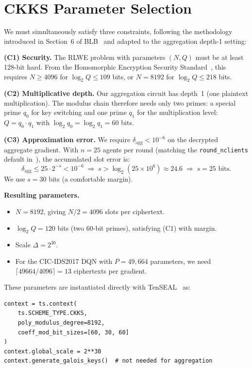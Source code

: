 \documentclass[letterpaper,journal]{IEEEtran}
\begin{document}
\section{CKKS Parameter Selection}\label{sec:parameters}

We must simultaneously satisfy three constraints, following the methodology
introduced in Section~6 of BLB~\cite{blb2025} and adapted to the aggregation
depth-1 setting:

\textbf{(C1) Security.}
The RLWE problem with parameters $(N, Q)$ must be at least 128-bit hard.
From the Homomorphic Encryption Security Standard~\cite{HEstandard}, this
requires $N \geq 4096$ for $\log_2 Q \leq 109$ bits, or $N = 8192$ for
$\log_2 Q \leq 218$ bits.

\textbf{(C2) Multiplicative depth.}
Our aggregation circuit has depth~1 (one plaintext multiplication).
The modulus chain therefore needs only two primes: a special prime $q_0$ for
key switching and one prime $q_1$ for the multiplication level:
$Q = q_0 \cdot q_1$ with $\log_2 q_0 = \log_2 q_1 = 60$ bits.

\textbf{(C3) Approximation error.}
We require $\delta_{\text{agg}} < 10^{-6}$ on the decrypted aggregate gradient.
With $n = 25$ agents per round (matching the \texttt{round\_nclients}
default in~\cite{frlconf2026}), the accumulated slot error is:
\[
  \delta_{\text{agg}} \leq 25 \cdot 2^{-s} < 10^{-6}
  \;\Rightarrow\;
  s > \log_2(25 \times 10^6) \approx 24.6 \;\Rightarrow\; s = 25\text{ bits}.
\]
We use $s = 30$ bits (a comfortable margin).

\textbf{Resulting parameters.}
\begin{itemize}
  \item $N = 8192$, giving $N/2 = 4096$ slots per ciphertext.
  \item $\log_2 Q = 120$ bits (two 60-bit primes), satisfying (C1) with margin.
  \item Scale $\Delta = 2^{30}$.
  \item For the CIC-IDS2017 DQN with $P = 49{,}664$ parameters, we need
        $\lceil 49664/4096 \rceil = 13$ ciphertexts per gradient.
\end{itemize}

These parameters are instantiated directly with TenSEAL~\cite{tenseal} as:
\begin{verbatim}
context = ts.context(
    ts.SCHEME_TYPE.CKKS,
    poly_modulus_degree=8192,
    coeff_mod_bit_sizes=[60, 30, 60]
)
context.global_scale = 2**30
context.generate_galois_keys()  # not needed for aggregation
\end{verbatim}
\end{document}

